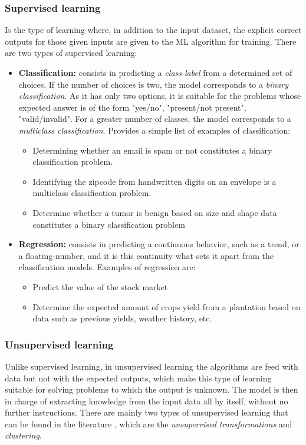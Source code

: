\subsubsection{Supervised learning}
Is the type of learning where, in addition to the input dataset, the explicit correct outputs for those given inputs are given to the \ac{ML} algorithm for training. There are two types of supervised learning:
\begin{itemize}
    \item \textbf{Classification:} consists in predicting a \emph{class label} from a determined set of choices. If the number of choices is two, the model corresponds to a \emph{binary classification}. As it has only two options, it is suitable for the problems whose expected answer is of the form "yes/no", "present/not present", "valid/invalid". For a greater number of classes, the model corresponds to a \emph{multiclass classification}. \cite{Andreas} Provides a simple list of examples of classification:
        \begin{itemize}
            \item Determining whether an email is spam or not constitutes a binary classification problem.
            \item Identifying the zipcode from handwritten digits on an envelope is a multiclass classification problem.
            \item Determine whether a tumor is benign based on size and shape data constitutes a binary classification problem
        \end{itemize}
    \item \textbf{Regression:} consists in predicting a continuous behavior, such as a trend, or a floating-number, and it is this continuity what sets it apart from the classification models. Examples of regression \cite{Andreas} are:
        \begin{itemize}
            \item Predict the value of the stock market
            \item Determine the expected amount of crops yield from a plantation based on data such as previous yields, weather history, etc.
        \end{itemize}
\end{itemize}

\subsubsection{Unsupervised learning}
Unlike supervised learning, in unsupervised learning the algorithms are feed with data but not with the expected outputs, which make this type of learning suitable for solving problems to which the output is unknown. The model is then in charge of extracting knowledge from the input data all by itself, without no further instructions. There are mainly two types of unsupervised learning that can be found in the literature \cite{Andreas}, which are the \emph{unsupervised transformations} and \emph{clustering}.


